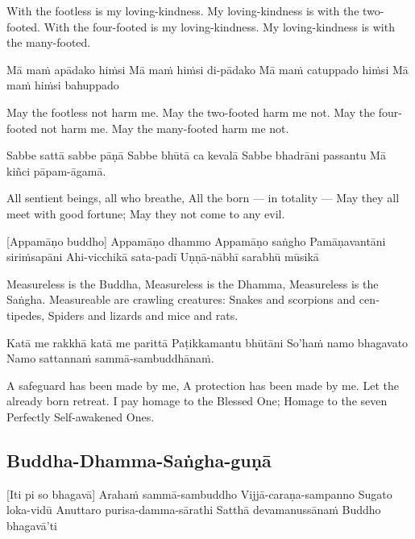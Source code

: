 \begin{english}
  With the footless is my loving-kindness.
  My loving-kindness is with the two-footed.
  With the four-footed is my loving-kindness.
  My loving-kindness is with the many-footed.
\end{english}

Mā maṁ apādako hiṁsi
Mā maṁ hiṁsi di-pādako
Mā maṁ catuppado hiṁsi
Mā maṁ hiṁsi bahuppado

\begin{english}
  May the footless not harm me.
  May the two-footed harm me not.
  May the four-footed not harm me.
  May the many-footed harm me not.
\end{english}

Sabbe sattā sabbe pāṇā
Sabbe bhūtā ca kevalā
Sabbe bhadrāni passantu
Mā kiñci pāpam-āgamā.

\begin{english}
  All sentient beings, all who breathe,
  All the born — in totality —
  May they all meet with good fortune;
  May they not come to any evil.
\end{english}

[Appamāṇo buddho]
Appamāṇo dhammo
Appamāṇo saṅgho
Pamāṇavantāni siriṁsapāni
Ahi-vicchikā sata-padī
Uṇṇā-nābhī sarabhū mūsikā

\begin{english}
  Measureless is the Buddha,
  Measureless is the Dhamma,
  Measureless is the Saṅgha.
  Measureable are crawling creatures:
  Snakes and scorpions and centipedes,
  Spiders and lizards and mice and rats.
\end{english}

Katā me rakkhā katā me parittā
Paṭikkamantu bhūtāni
So’haṁ namo bhagavato
Namo sattannaṁ sammā-sambuddhānaṁ.

\begin{english}
  A safeguard has been made by me,
  A protection has been made by me.
  Let the already born retreat.
  I pay homage to the Blessed One;
  Homage to the seven Perfectly Self-awakened Ones.
\end{english}

\suttaRef{[AN 4.67]}

\subsection{Buddha-Dhamma-Saṅgha-guṇā}
[Iti pi so bhagavā]
Arahaṁ sammā-sambuddho
Vijjā-caraṇa-sampanno
Sugato loka-vidū
Anuttaro purisa-damma-sārathi
Satthā devamanussānaṁ
Buddho bhagavā’ti

